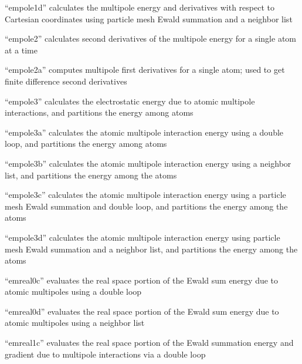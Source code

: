 \documentclass[letterpaper,11pt,english]{sphinxmanual}
\begin{document}
“empole1d” calculates the multipole energy and derivatives
with respect to Cartesian coordinates using particle mesh Ewald
summation and a neighbor list


“empole2” calculates second derivatives of the multipole energy
for a single atom at a time


“empole2a” computes multipole first derivatives for a single
atom; used to get finite difference second derivatives


“empole3” calculates the electrostatic energy due to atomic
multipole interactions, and partitions the energy among atoms


“empole3a” calculates the atomic multipole interaction energy
using a double loop, and partitions the energy among atoms


“empole3b” calculates the atomic multipole interaction energy
using a neighbor list, and partitions the energy among the atoms


“empole3c” calculates the atomic multipole interaction energy
using a particle mesh Ewald summation and double loop, and
partitions the energy among the atoms


“empole3d” calculates the atomic multipole interaction energy
using particle mesh Ewald summation and a neighbor list, and
partitions the energy among the atoms


“emreal0c” evaluates the real space portion of the Ewald sum
energy due to atomic multipoles using a double loop


“emreal0d” evaluates the real space portion of the Ewald sum
energy due to atomic multipoles using a neighbor list


“emreal1c” evaluates the real space portion of the Ewald
summation energy and gradient due to multipole interactions
via a double loop
\end{document}
